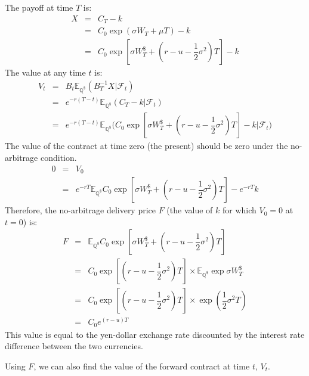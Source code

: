 \documentclass[uplatex,a4j,12pt,dvipdfmx]{jsarticle}
\begin{document}
The payoff at time $T$ is:
%
%
\begin{eqnarray*}
	X
	&=&
	C_{T} - k
	\\ &=&
	C_{0} \exp (\sigma W_{T} + \mu T) - k
	\\ &=&
	C_{0}
	\exp
	\left[
		\sigma W^{\$}_{T}
		+
		\left(
		r - u -
		\dfrac{1}{2}
		\sigma^{2}
		\right) T
		\right]
	- k
\end{eqnarray*}
%
%
The value at any time $t$ is:
%
%
\begin{eqnarray*}
	V_{t}
	&=&
	B_{t}
	\mathbb{E}_{\mathbb{Q}^{ \$ }}
	( B_{T}^{-1} X | \mathcal{F}_{t} )
	\\ &=&
	e^{-r(T-t)}
	\mathbb{E}_{\mathbb{Q}^{ \$ }}
	( C_{T} - k | \mathcal{F}_{t} )
	\\ &=&
	e^{-r(T-t)}
	\mathbb{E}_{\mathbb{Q}^{ \$ }}
	\Big(
	C_{0}
	\exp
	\left[
		\sigma W^{\$}_{T}
		+
		\left(
		r - u -
		\dfrac{1}{2}
		\sigma^{2}
		\right) T
		\right]
	- k
	\Big| \mathcal{F}_{t} \Big)
\end{eqnarray*}
%
%
The value of the contract at time zero (the present) should be zero under the no-arbitrage condition.
%
%
\begin{eqnarray*}
	0
	&=&
	V_{0}
	\\ &=&
	e^{-rT}
	\mathbb{E}_{\mathbb{Q}^{ \$ }}
	C_{0}
	\exp
	\left[
		\sigma W^{\$}_{T}
		+
		\left(
		r - u -
		\dfrac{1}{2}
		\sigma^{2}
		\right) T
		\right]
	- e^{-rT} k
\end{eqnarray*}
%
%
Therefore, the no-arbitrage delivery price $F$ (the value of $k$ for which $V_{0}=0$ at $t=0$) is:
%
%
\begin{eqnarray*}
	F
	&=&
	\mathbb{E}_{\mathbb{Q}^{ \$ }}
	C_{0}
	\exp
	\left[
		\sigma W^{\$}_{T}
		+
		\left(
		r - u -
		\dfrac{1}{2}
		\sigma^{2}
		\right) T
		\right]
	\\ &=&
	C_{0}
	\exp
	\left[
		\left(
		r - u -
		\dfrac{1}{2}
		\sigma^{2}
		\right) T
		\right]
	\times
	\mathbb{E}_{\mathbb{Q}^{ \$ }}
	\exp
	\sigma W^{\$}_{T}
	\\ &=&
	C_{0}
	\exp
	\left[
		\left(
		r - u -
		\dfrac{1}{2}
		\sigma^{2}
		\right) T
		\right]
	\times
	\exp
	\left(
	\dfrac{1}{2}
	\sigma^{2} T
	\right)
	\\ &=&
	C_{0}
	e^{(r-u)T}
\end{eqnarray*}
%
%
This value is equal to the yen-dollar exchange rate discounted by the interest rate difference between the two currencies.

Using $F$, we can also find the value of the forward contract at time $t$, $V_{t}$.
\end{document}
